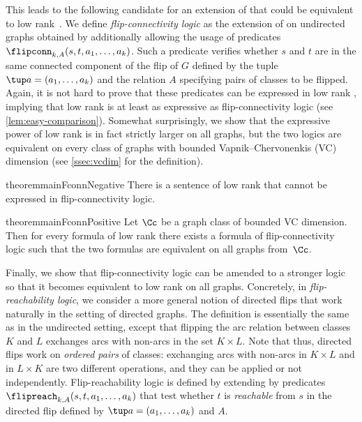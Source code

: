 This leads to the following candidate for an extension of \fo that could be equivalent to low rank~\mso. We define {\em{flip-connectivity logic}} as the extension of \fo on undirected graphs obtained by additionally allowing the usage of predicates $\flipconn_{k, A}(s, t, a_1, \ldots, a_k)$. Such a predicate verifies whether $s$ and $t$ are in the same connected component of the flip of $G$ defined by the tuple $\tup a=(a_1,\ldots,a_k)$ and the relation $A$ specifying pairs of classes to be flipped. Again, it is not hard to prove that these predicates can be expressed in low rank \mso, implying that low rank \mso is at least as expressive as flip-connectivity logic (see \cref{lem:easy-comparison}). Somewhat surprisingly, we show that the expressive power of low rank \mso is in fact strictly larger on all graphs, but the two logics are equivalent on every class of graphs with bounded Vapnik--Chervonenkis (VC) dimension (see \cref{ssec:vcdim} for the definition).

\begin{restatable}{theorem}{mainFconnNegative}\label{thm:main-fconn-negative}
    There is a sentence of low rank \mso that cannot be expressed in flip-connectivity logic.
\end{restatable}

\vspace{-0.3cm}

\begin{restatable}{theorem}{mainFconnPositive}\label{thm:main-fconn-positive}
    Let $\Cc$ be a graph class of bounded VC dimension. Then for every formula of low rank \mso there exists a formula of flip-connectivity logic such that the two formulas are equivalent on all graphs from~$\Cc$.
\end{restatable}

Finally, we show that flip-connectivity logic can be amended to a stronger logic so that it becomes equivalent to low rank \mso on all graphs. Concretely, in {\em{flip-reachability logic}}, we consider a more general notion of directed flips that work naturally in the setting of directed graphs. The definition is essentially the same as in the undirected setting, except that flipping the arc relation between classes $K$ and $L$ exchanges arcs with non-arcs in the set $K\times L$. Note that thus, directed flips work on {\em{ordered pairs}} of classes: exchanging arcs with non-arcs in $K\times L$ and in $L\times K$ are two different operations, and they can be applied or not independently. Flip-reachability logic is defined by extending \fo by predicates $\flipreach_{k, A}(s, t, a_1, \ldots, a_k)$ that test whether $t$ is {\em{reachable}} from $s$ in the directed flip defined by $\tup a=(a_1,\ldots,a_k)$ and $A$.

